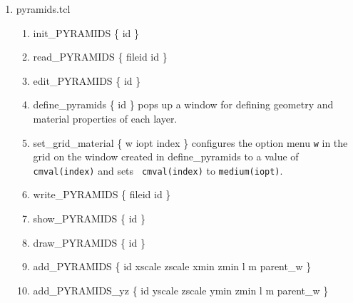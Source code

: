 \documentclass[12pt]{book}
\begin{document}
\begin{enumerate}
\item pyramids.tcl
\begin{enumerate}
\item {\sf init\_PYRAMIDS \{ id \}}
\item {\sf read\_PYRAMIDS \{ fileid id \}}
\item {\sf edit\_PYRAMIDS \{ id \}}
\item {\sf define\_pyramids \{ id \}} pops up a window for defining
geometry and material properties of each layer.
\item {\sf set\_grid\_material \{ w iopt index \}} configures the option
menu {\tt w} in the grid on the window created in {\sf
define\_pyramids} to a value of {\tt cmval(index)} and sets {\tt
cmval(index)} to {\tt medium(iopt)}.
\item {\sf write\_PYRAMIDS \{ fileid id \}}
\item {\sf show\_PYRAMIDS \{ id \}}
\item {\sf draw\_PYRAMIDS \{ id \}}
\item {\sf add\_PYRAMIDS \{ id xscale zscale xmin zmin l m parent\_w \}}
\item {\sf add\_PYRAMIDS\_yz \{ id yscale zscale ymin zmin l m parent\_w \}}
\end{enumerate}


\end{enumerate}
\end{document}
